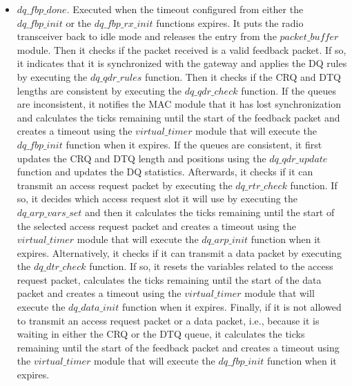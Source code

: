 \begin{itemize}
\item $dq\_fbp\_done$. Executed when the timeout configured from either the $dq\_fbp\_init$ or the $dq\_fbp\_rx\_init$ functions expires. It puts the radio transceiver back to idle mode and releases the entry from the $packet\_buffer$ module. Then it checks if the packet received is a valid feedback packet. If so, it indicates that it is synchronized with the gateway and applies the DQ rules by executing the $dq\_qdr\_rules$ function. Then it checks if the CRQ and DTQ lengths are consistent by executing the $dq\_qdr\_check$ function. If the queues are inconsistent, it notifies the MAC module that it has lost synchronization and calculates the ticks remaining until the start of the feedback packet and creates a timeout using the $virtual\_timer$ module that will execute the $dq\_fbp\_init$ function when it expires. If the queues are consistent, it first updates the CRQ and DTQ length and positions using the $dq\_qdr\_update$ function and updates the DQ statistics. Afterwards, it checks if it can transmit an access request packet by executing the $dq\_rtr\_check$ function. If so, it decides which access request slot it will use by executing the $dq\_arp\_vars\_set$ and then it calculates the ticks remaining until the start of the selected access request packet and creates a timeout using the $virtual\_timer$ module that will execute the $dq\_arp\_init$ function when it expires. Alternatively, it checks if it can transmit a data packet by executing the $dq\_dtr\_check$ function. If so, it resets the variables related to the access request packet, calculates the ticks remaining until the start of the data packet and creates a timeout using the $virtual\_timer$ module that will execute the $dq\_data\_init$ function when it expires. Finally, if it is not allowed to transmit an access request packet or a data packet, i.e., because it is waiting in either the CRQ or the DTQ queue, it calculates the ticks remaining until the start of the feedback packet and creates a timeout using the $virtual\_timer$ module that will execute the $dq\_fbp\_init$ function when it expires.


\end{itemize}
